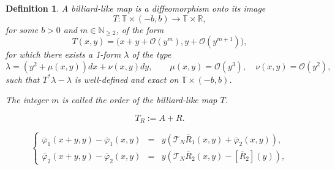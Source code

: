\documentclass[10pt,a4paper]{amsart}
\newtheorem{definition}{Definition}
\newcommand{\Function}[5]{\begin{array}{cccc} #1 : & #2 & \rightarrow & #3 \\ & #4 & \mapsto & #5 \end{array}}
\newcommand{\N}{\mathbb{N}}
\newcommand{\R}{\mathbb{R}}
\newcommand{\T}{\mathbb{T}}
\newcommand{\bigo}[1]{\mathcal{O}\left(#1\right)}
\begin{document}
\begin{definition}
\label{def:billiard-like}
A \emph{billiard-like map} is a diffeomorphism onto its image $$T: \T \times (-b, b) \to \T \times \R,$$
for some $b > 0$ and $m \in \N_{\geq 2}$, of the form
\begin{equation}
 \label{equation:expression_billiard_like_maps}
T(x, y) = \big(x+y+\bigo{y^m},y+\bigo{y^{m+1}}\big),
\end{equation}
 for which there exists a 1-form $\lambda$ of the type
\begin{equation}
    \label{equation:expression_one_form}
\lambda = (y^2 + \mu(x, y))dx + \nu(x, y)dy, \qquad \mu(x, y) = \bigo{y^3}, \quad \nu(x, y)= \bigo{y^2},
\end{equation}
such that $T^*\lambda - \lambda $ is well-defined and exact on $\T \times (-b, b)$. 

The integer $m$ is called the \emph{order} of the billiard-like map $T$.
\end{definition}

\begin{equation}
\label{eq:perturbation_form}
T_R := A+R.
\end{equation}

\begin{equation}
\label{equation:multi_difference_equation}
 \left\{
 \begin{array}{rcl}
 \overline\varphi_1(x+y,y)-\overline\varphi_1(x,y) &=& y(\mathscr T_N \overline R_1(x, y) +\overline\varphi_2(x,y)),\\
 \overline\varphi_2(x+y,y)-\overline\varphi_2(x,y) &=& y (\mathscr T_N \overline R_2(x, y) - [\overline R_2](y)),
 \end{array}
 \right.
\end{equation}
\end{document}

